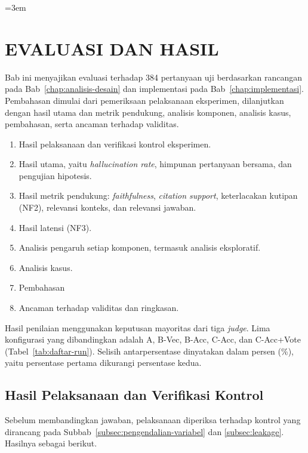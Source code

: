 \emergencystretch=3em
\chapter{EVALUASI DAN HASIL}
\label{chap:evaluasi}

Bab ini menyajikan evaluasi terhadap 384 pertanyaan uji berdasarkan rancangan pada Bab~\ref{chap:analisis-desain} dan implementasi pada Bab~\ref{chap:implementasi}. Pembahasan dimulai dari pemeriksaan pelaksanaan eksperimen, dilanjutkan dengan hasil utama dan metrik pendukung, analisis komponen, analisis kasus, pembahasan, serta ancaman terhadap validitas.

\begin{enumerate}
   \item Hasil pelaksanaan dan verifikasi kontrol eksperimen.
   \item Hasil utama, yaitu \emph{hallucination rate}, himpunan pertanyaan bersama, dan pengujian hipotesis.
   \item Hasil metrik pendukung: \emph{faithfulness}, \emph{citation support}, keterlacakan kutipan (NF2), relevansi konteks, dan relevansi jawaban.
   \item Hasil latensi (NF3).
   \item Analisis pengaruh setiap komponen, termasuk analisis eksploratif.
   \item Analisis kasus.
   \item Pembahasan
   \item Ancaman terhadap validitas dan ringkasan.
\end{enumerate}

Hasil penilaian menggunakan keputusan mayoritas dari tiga \emph{judge}. Lima konfigurasi yang dibandingkan adalah A, B-Vec, B-Acc, C-Acc, dan C-Acc+Vote (Tabel~\ref{tab:daftar-run}). Selisih antarpersentase dinyatakan dalam persen (\%), yaitu persentase pertama dikurangi persentase kedua. 

\section{Hasil Pelaksanaan dan Verifikasi Kontrol}
\label{sec:hasil-pelaksanaan}

Sebelum membandingkan jawaban, pelaksanaan diperiksa terhadap kontrol yang dirancang pada Subbab~\ref{subsec:pengendalian-variabel} dan \ref{subsec:leakage}. Hasilnya sebagai berikut.

